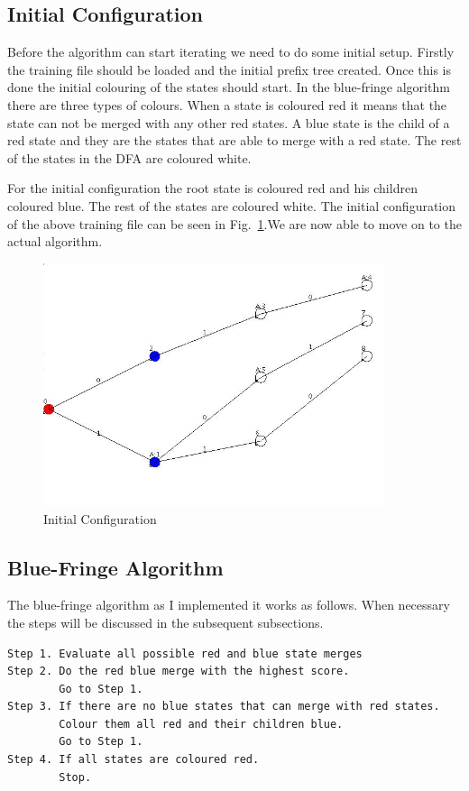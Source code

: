 \documentclass[a4paper,11pt,titlepage]{article}
\begin{document}
\subsection{Initial Configuration}
Before the algorithm can start iterating we need to do some initial setup. Firstly the training file should be loaded and the initial prefix tree created. Once this is done the initial colouring of the states should start. In the blue-fringe algorithm there are three types of colours. When a state is coloured red it means that the state can not be merged with any other red states. A blue state is the child of a red state and they are the states that are able to merge with a red state. The rest of the states in the DFA are coloured white.

For the initial configuration the root state is coloured red and his children coloured blue. The rest of the states are coloured white. The initial configuration of the above training file can be seen in Fig.~\ref{Fig:step1}.We are now able to move on to the actual algorithm.

\begin{figure}[htbp]
   \centering
   \includegraphics[width=10cm]{step1.png}
   \caption{Initial Configuration}
   \label{Fig:step1}
\end{figure}

\subsection{Blue-Fringe Algorithm}
The blue-fringe algorithm as I implemented it works as follows. When necessary the steps will be discussed in the subsequent subsections.
\begin{verbatim}
Step 1. Evaluate all possible red and blue state merges
Step 2. Do the red blue merge with the highest score.
        Go to Step 1.
Step 3. If there are no blue states that can merge with red states.
        Colour them all red and their children blue.
        Go to Step 1.
Step 4. If all states are coloured red.
        Stop.
\end{verbatim}
\end{document}
